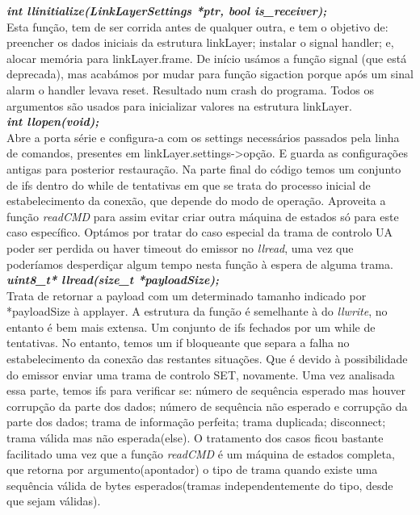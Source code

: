 \documentclass[a4paper]{article}
\begin{document}
\noindent\textbf{\textit{int llinitialize(LinkLayerSettings *ptr, bool
is\_receiver);}}\\ Esta função, tem de ser corrida antes de qualquer outra, e
tem o objetivo de: preencher os dados iniciais da estrutura linkLayer; instalar
o signal handler; e, alocar memória para linkLayer.frame. De início usámos a
função signal (que está deprecada), mas acabámos por mudar para função
sigaction porque após um sinal alarm o handler levava reset. Resultado num
crash do programa. Todos os argumentos são usados para inicializar valores na
estrutura linkLayer.\\

\noindent\textbf{\textit{int llopen(void);}}\\ Abre a porta série e configura-a
com os settings necessários passados pela linha de comandos, presentes em
linkLayer.settings->{opção}. E guarda as configurações antigas para posterior
restauração. Na parte final do código temos um conjunto de ifs dentro do while
de tentativas em que se trata do processo inicial de estabelecimento da
conexão, que depende do modo de operação. Aproveita a função \textit{readCMD}
para assim evitar criar outra máquina de estados só para este caso específico.
Optámos por tratar do caso especial da trama de controlo UA poder ser perdida
ou haver timeout do emissor no \textit{llread}, uma vez que poderíamos
desperdiçar algum tempo nesta função à espera de alguma trama.\\

\noindent\textbf{\textit{uint8\_t* llread(size\_t *payloadSize);}}\\ Trata de
retornar a payload com um determinado tamanho indicado por *payloadSize à
applayer. A estrutura da função é semelhante à do \textit{llwrite}, no entanto
é bem mais extensa. Um conjunto de ifs fechados por um while de tentativas. No
entanto, temos um if bloqueante que separa a falha no estabelecimento da
conexão das restantes situações. Que é devido à possibilidade do emissor enviar
uma trama de controlo SET, novamente. Uma vez analisada essa parte, temos ifs
para verificar se: número de sequência esperado mas houver corrupção da parte
dos dados; número de sequência não esperado e corrupção da parte dos dados;
trama de informação perfeita; trama duplicada; disconnect; trama válida mas não
esperada(else). O tratamento dos casos ficou bastante facilitado uma vez que a
função \textit{readCMD} é um máquina de estados completa, que retorna por
argumento(apontador) o tipo de trama quando existe uma sequência válida de
bytes esperados(tramas independentemente do tipo, desde que sejam válidas). \\
\end{document}
